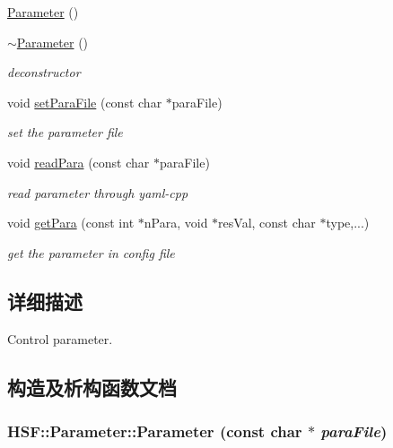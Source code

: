 \begin{DoxyCompactItemize}
\hyperlink{classHSF_1_1Parameter_a6c1b209f15999e6ddf19d756adbdbae8}{Parameter} ()
\item 
\hyperlink{classHSF_1_1Parameter_ac59ca61eccd3d1e8ad38133c06ea8178}{$\sim$Parameter} ()
\begin{DoxyCompactList}\small\item\em deconstructor \item\end{DoxyCompactList}\item 
void \hyperlink{classHSF_1_1Parameter_a535c67d4b12636e498b98d3e6f0723d1}{setParaFile} (const char $\ast$paraFile)
\begin{DoxyCompactList}\small\item\em set the parameter file \item\end{DoxyCompactList}\item 
void \hyperlink{classHSF_1_1Parameter_a1701a921961849020f7dcd6bf2a8d150}{readPara} (const char $\ast$paraFile)
\begin{DoxyCompactList}\small\item\em read parameter through yaml-\/cpp \item\end{DoxyCompactList}\item 
void \hyperlink{classHSF_1_1Parameter_a43cde4ecf939bca66b2dae7566eea056}{getPara} (const int $\ast$nPara, void $\ast$resVal, const char $\ast$type,...)
\begin{DoxyCompactList}\small\item\em get the parameter in config file \item\end{DoxyCompactList}\end{DoxyCompactItemize}


\subsection{详细描述}
Control parameter. 

\subsection{构造及析构函数文档}
\hypertarget{classHSF_1_1Parameter_a99364861f624da340a461c0226bcca63}{
\subsubsection[{Parameter}]{\setlength{\rightskip}{0pt plus 5cm}HSF::Parameter::Parameter (const char $\ast$ {\em paraFile})}}
\label{classHSF_1_1Parameter_a99364861f624da340a461c0226bcca63}


